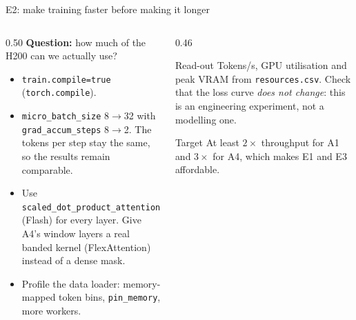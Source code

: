 \documentclass[aspectratio=169,11pt]{beamer}
\newcommand{\code}[1]{\texttt{\small #1}}
\begin{document}
\begin{frame}{E2: make training faster before making it longer}
  \begin{columns}[T]
    \begin{column}{0.50\textwidth}
      \small
      \textbf{Question:} how much of the H200 can we actually use?
      \begin{itemize}
        \item \code{train.compile=true} (\code{torch.compile}).
        \item \code{micro\_batch\_size} 8$\to$32 with \code{grad\_accum\_steps} 8$\to$2. The tokens per step stay the same, so the results remain comparable.
        \item Use \code{scaled\_dot\_product\_attention} (Flash) for every layer. Give A4's window layers a real banded kernel (FlexAttention) instead of a dense mask.
        \item Profile the data loader: memory-mapped token bins, \code{pin\_memory}, more workers.
      \end{itemize}
    \end{column}
    \begin{column}{0.46\textwidth}
      \begin{block}{Read-out}
        \small Tokens/s, GPU utilisation and peak VRAM from \code{resources.csv}.
        Check that the loss curve \emph{does not change}: this is an engineering experiment, not a modelling one.
      \end{block}
      \begin{exampleblock}{Target}
        \small At least $2\times$ throughput for A1 and $3\times$ for A4, which makes E1 and E3 affordable.
      \end{exampleblock}
    \end{column}
  \end{columns}
\end{frame}
\end{document}
